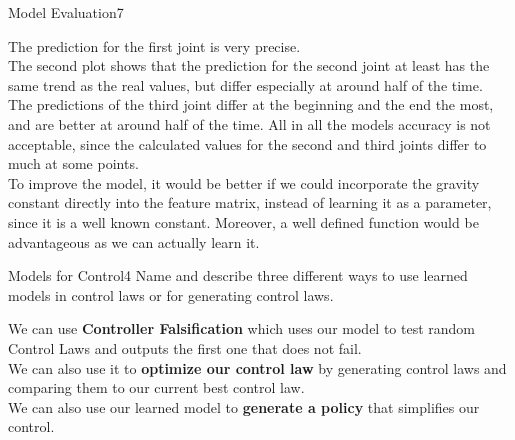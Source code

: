 \begin{questions}
\begin{question}{Model Evaluation}{7}
\begin{answer}
	The prediction for the first joint is very precise.\\
	The second plot shows that the prediction for the second joint at least has the same trend as the real values, but differ especially at around half of the time.\\
	The predictions of the third joint differ at the beginning and the end the most, and are better at around half of the time. 
	All in all the models accuracy is not acceptable, since the calculated values for the second and third joints differ to much at some points.\\
	
	To improve the model, it would be better if we could incorporate the gravity constant directly into the feature matrix, instead of learning it as a parameter, since it is a well known constant. Moreover, a well defined function would be advantageous as we can actually learn it.

\end{answer}

\end{question}



\begin{question}[bonus]{Models for Control}{4}
Name and describe three different ways to use learned models in control laws or for generating control laws.

\begin{answer}
We can use \textbf{Controller Falsification} which uses our model to test random Control Laws and outputs the first one that does not fail.\\
We can also use it to \textbf{optimize our control law} by generating control laws and comparing them to our current best control law. \\
We can also use our learned model to \textbf{generate a policy} that simplifies our control.
\end{answer}

\end{question}


\end{questions}
